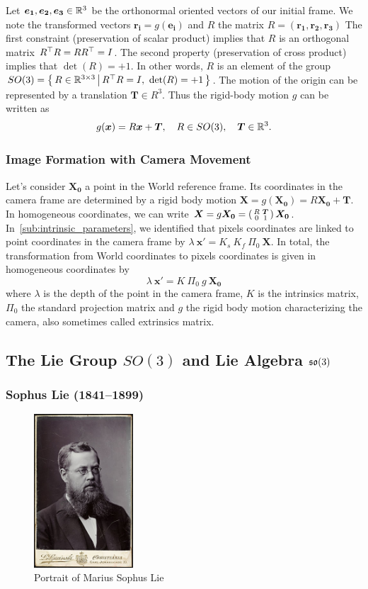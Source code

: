 Let $\bm{e_1}, \bm{e_2}, \bm{e_3} \in \mathbb{R}^3$
be the orthonormal oriented vectors of our initial frame.
We note the transformed vectors $\bm{r_i} = g(\bm{e_i})$
and $R$ the matrix $R = (\bm{r_1}, \bm{r_2}, \bm{r_3})$
The first constraint (preservation of scalar product) implies that
$R$ is an orthogonal matrix $R^{\top}R=RR^{\top}=I$.
The second property (preservation of cross product) implies that $\det(R) = +1$.
In other words, $R$ is an element of the group
$SO(3) = \left\{\, {R \in \mathbb{R}^{3 \times{} 3}} \, \middle| \, {R^{\top}R=I,\ \det(R) = +1} \,\right\}$.
The motion of the origin can be represented by a translation $\bm{T} \in R^3$.
Thus the rigid-body motion $g$ can be written as
\[
	g(\bm{x}) = R\bm{x} + \bm{T},\quad R \in SO(3),\quad \bm{T} \in \mathbb{R}^3.
\]

\subsubsection{Image Formation with Camera Movement}%
\label{ssub:projectionWithMovement}

Let's consider $\bm{X_0}$ a point in the World reference frame.
Its coordinates in the camera frame are determined by a rigid body motion
$\bm{X} = g(\bm{X_0}) = R \bm{X_0} + \bm{T}$.
In homogeneous coordinates, we can write
$\bm{X} = g\bm{X_0} = \left(\begin{smallmatrix}  R & \bm{T}\\ 0 & 1 \end{smallmatrix} \right) \bm{X_0}$.
In~\ref{sub:intrinsic_parameters}, we identified that pixels coordinates
are linked to point coordinates in the camera frame by
$\lambda\ \bm{x'} = K_s\ K_f\ \Pi_0\ \bm{X}$.
In total, the transformation from World coordinates to pixels coordinates
is given in homogeneous coordinates by
\[\boxed{
	\lambda\ \bm{x'} = K\ \Pi_0\ g\ \bm{X_0}
}\]
where $\lambda$ is the depth of the point in the camera frame,
$K$ is the intrinsics matrix, $\Pi_0$ the standard projection matrix
and $g$ the rigid body motion characterizing the camera,
also sometimes called extrinsics matrix.


\subsection{The Lie Group $SO(3)$ and Lie Algebra $\mathfrak{so}(3)$}%
\label{sub:the_lie_group_so_3}


\subsubsection{Sophus Lie (1841--1899)}%
\label{ssub:sophus_lie_1841_1899}

\begin{figure}[ht]
\centering
\includegraphics[width=10em]{assets/img/sophus_lie.jpg}
\caption*{Portrait of Marius Sophus Lie}
\end{figure}

